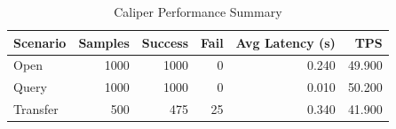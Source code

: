 \begin{table}
\caption{Caliper Performance Summary}
\label{tab:caliper_round}
\begin{tabular}{lrrrrr}
\toprule
Scenario & Samples & Success & Fail & Avg Latency (s) & TPS \\
\midrule
Open & 1000 & 1000 & 0 & 0.240 & 49.900 \\
Query & 1000 & 1000 & 0 & 0.010 & 50.200 \\
Transfer & 500 & 475 & 25 & 0.340 & 41.900 \\
\bottomrule
\end{tabular}
\end{table}
